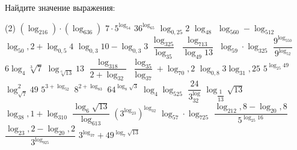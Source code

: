 \begin{class}[number=3]
	\begin{listofex}
		\item {}
		\item Найдите значение выражения:
			\begin{tasks}(2)
				\task \( (\log_216)\cdot(\log_636) \)
				\task \( 7\cdot5^{\log_54} \)
				\task \( 36^{\log_65} \)
				\task \( \log_{0,25}2 \)
				\task \( \log_48 \)
				\task \( \log_560-\log_512 \)
				\task \( \log_50,2+\log_{0,5}4 \)
				\task \( \log_{0,3}10-\log_{0,3}3 \)
				\task \( \dfrac{\log_325}{\log_35} \)
				\task \( \dfrac{\log_713}{\log_{49}13} \)
				\task \( \log_59\cdot\log_325 \)
				\task \( \dfrac{9^{\log_550}}{9^{\log_52}} \)
				\task \( 6\log_4\sqrt[3]{7} \)
				\task \( \log_{\sqrt[6]{13}}13 \)
				\task \( \dfrac{\log_318}{2+\log_32} \)
				\task \( \dfrac{\log_35}{\log_37}+\log_70,2 \)
				\task \( \log_{0,8}3\log_31,25 \)
				\task \( 5^{\log_{25}49} \)
				\task \( \log^2_{\sqrt{7}}49 \)
				\task \( 5^{3+\log_52} \)
				\task \( 8^{2+\log_83} \)
				\task \( 64^{\log_8\sqrt{3}} \)
				\task \( \log_4\log_525 \)
				\task \( \dfrac{24}{3^\log_32} \)
				\task \( \log_{\dfrac{1}{13}}\sqrt{13} \)
				\task \( \log_38,1+\log_310 \)
				\task \( \dfrac{\log_6\sqrt{13}}{\log_613} \)
				\task \( \left( 3^{\log_23} \right)^{\log_32}\)
				\task \( \log_57\cdot\log_725 \)
				\task \( \dfrac{\log_212,8-\log_20,8}{5^{\log_{25}16}} \)
				\task \( \dfrac{\log_23,2-\log_20,2}{3^{\log_925}} \)
				\task \( 3^{\log_37}+49^{\log_7{\sqrt{13}}} \)
			\end{tasks}	
	\end{listofex}
\end{class}
%
%
%
%
%
%
